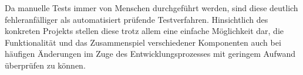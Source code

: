Da manuelle Tests immer von Menschen durchgeführt werden, sind diese deutlich fehleranfälliger als automatisiert prüfende Testverfahren. Hinsichtlich des konkreten Projekts stellen diese trotz allem eine einfache Möglichkeit dar, die Funktionalität und das Zusammenspiel verschiedener Komponenten auch bei häufigen Änderungen im Zuge des Entwicklungsprozesses mit geringem Aufwand überprüfen zu können. 

